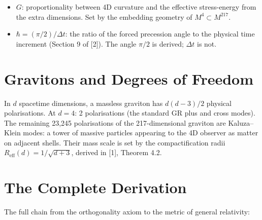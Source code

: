 \documentclass[12pt,a4paper]{article}
\begin{document}
\begin{itemize}
\item $G$: proportionality between 4D curvature and the effective stress-energy from the
extra dimensions. Set by the embedding geometry of $M^4 \subset M^{217}$.
\item $\hbar = (\pi/2)/\Delta t$: the ratio of the forced precession angle to the physical time increment
(Section 9 of [2]). The angle $\pi/2$ is derived; $\Delta t$ is not.
\end{itemize}

\section{Gravitons and Degrees of Freedom}

In $d$ spacetime dimensions, a massless graviton has $d(d - 3)/2$ physical polarisations. At
$d = 4$: 2 polarisations (the standard GR plus and cross modes). The remaining 23,245
polarisations of the 217-dimensional graviton are Kaluza--Klein modes: a tower of massive
particles appearing to the 4D observer as matter on adjacent shells. Their mass scale is
set by the compactification radii $R_{\text{eff}}(d) = 1/\sqrt{d + 3}$, derived in [1], Theorem 4.2.

\section{The Complete Derivation}

The full chain from the orthogonality axiom to the metric of general relativity:
\end{document}
